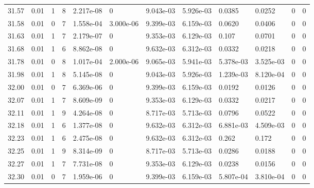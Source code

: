 \documentclass[preview]{standalone}
\begin{document}
{{{{{{{{{{{\begin{tabular}{L{1.2cm}C{1.2cm} C{0.3cm}C{0.5cm} C{1.4cm}C{1.4cm} C{1.4cm}C{1.4cm} C{1.6cm}C{1.6cm} C{1.6cm}C{1.6cm}}
  31.57  &  0.01  & 1     &  8 &  2.217e-08  & 0  &  9.043e-03&   5.926e-03& 0.0385 & 0.0252   &  0 & 0  \\ 
  31.58  &  0.01  & 0     &  7 &  1.558e-04  & 3.000e-06  &  9.399e-03&   6.159e-03& 0.0620 & 0.0406   &  0 & 0  \\ 
  31.63  &  0.01  & 1     &  7 &  2.179e-07  & 0  &  9.353e-03&   6.129e-03& 0.107 & 0.0701   &  0 & 0  \\ 
  31.68  &  0.01  & 1     &  6 &  8.862e-08  & 0  &  9.632e-03&   6.312e-03& 0.0332 & 0.0218   &  0 & 0  \\ 
  31.78  &  0.01  & 0     &  8 &  1.017e-04  & 2.000e-06  &  9.065e-03&   5.941e-03& 5.378e-03 & 3.525e-03   &  0 & 0  \\ 
  31.98  &  0.01  & 1     &  8 &  5.145e-08  & 0  &  9.043e-03&   5.926e-03& 1.239e-03 & 8.120e-04   &  0 & 0  \\ 
  32.00  &  0.01  & 0     &  7 &  6.369e-06  & 0  &  9.399e-03&   6.159e-03& 0.0192 & 0.0126   &  0 & 0  \\ 
  32.07  &  0.01  & 1     &  7 &  8.609e-09  & 0  &  9.353e-03&   6.129e-03& 0.0332 & 0.0217   &  0 & 0  \\ 
  32.11  &  0.01  & 1     &  9 &  4.264e-08  & 0  &  8.717e-03&   5.713e-03& 0.0796 & 0.0522   &  0 & 0  \\ 
  32.18  &  0.01  & 1     &  6 &  1.377e-08  & 0  &  9.632e-03&   6.312e-03& 6.881e-03 & 4.509e-03   &  0 & 0  \\ 
  32.23  &  0.01  & 1     &  6 &  2.475e-08  & 0  &  9.632e-03&   6.312e-03& 0.262 & 0.172   &  0 & 0  \\ 
  32.25  &  0.01  & 1     &  9 &  8.314e-09  & 0  &  8.717e-03&   5.713e-03& 0.0286 & 0.0188   &  0 & 0  \\ 
  32.27  &  0.01  & 1     &  7 &  7.731e-08  & 0  &  9.353e-03&   6.129e-03& 0.0238 & 0.0156   &  0 & 0  \\ 
  32.30  &  0.01  & 0     &  7 &  1.959e-06  & 0  &  9.399e-03&   6.159e-03& 5.807e-04 & 3.810e-04   &  0 & 0  \\ 
\hline 
\end{tabular} 

}}}}}}}}}}}
\end{document}
